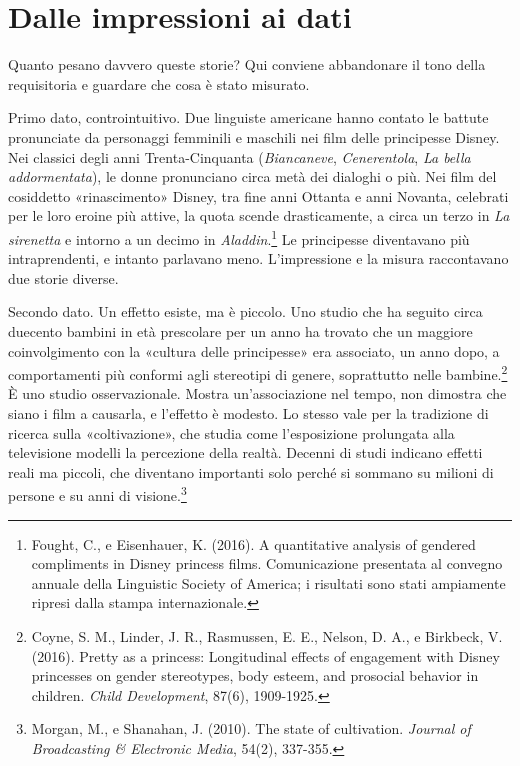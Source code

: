 \section{Dalle impressioni ai dati}
\label{sec:p2c24-dati}

Quanto pesano davvero queste storie? Qui conviene abbandonare il tono della requisitoria e guardare che cosa è stato misurato.

Primo dato, controintuitivo. Due linguiste americane hanno contato le battute pronunciate da personaggi femminili e maschili nei film delle principesse Disney. Nei classici degli anni Trenta-Cinquanta (\textit{Biancaneve}, \textit{Cenerentola}, \textit{La bella addormentata}), le donne pronunciano circa metà dei dialoghi o più. Nei film del cosiddetto «rinascimento» Disney, tra fine anni Ottanta e anni Novanta, celebrati per le loro eroine più attive, la quota scende drasticamente, a circa un terzo in \textit{La sirenetta} e intorno a un decimo in \textit{Aladdin}.\footnote{Fought, C., e Eisenhauer, K. (2016). A quantitative analysis of gendered compliments in Disney princess films. Comunicazione presentata al convegno annuale della Linguistic Society of America; i risultati sono stati ampiamente ripresi dalla stampa internazionale.} Le principesse diventavano più intraprendenti, e intanto parlavano meno. L'impressione e la misura raccontavano due storie diverse.

Secondo dato. Un effetto esiste, ma è piccolo. Uno studio che ha seguito circa duecento bambini in età prescolare per un anno ha trovato che un maggiore coinvolgimento con la «cultura delle principesse» era associato, un anno dopo, a comportamenti più conformi agli stereotipi di genere, soprattutto nelle bambine.\footnote{Coyne, S. M., Linder, J. R., Rasmussen, E. E., Nelson, D. A., e Birkbeck, V. (2016). Pretty as a princess: Longitudinal effects of engagement with Disney princesses on gender stereotypes, body esteem, and prosocial behavior in children. \textit{Child Development}, 87(6), 1909-1925.} È uno studio osservazionale. Mostra un'associazione nel tempo, non dimostra che siano i film a causarla, e l'effetto è modesto. Lo stesso vale per la tradizione di ricerca sulla «coltivazione», che studia come l'esposizione prolungata alla televisione modelli la percezione della realtà. Decenni di studi indicano effetti reali ma piccoli, che diventano importanti solo perché si sommano su milioni di persone e su anni di visione.\footnote{Morgan, M., e Shanahan, J. (2010). The state of cultivation. \textit{Journal of Broadcasting \& Electronic Media}, 54(2), 337-355.}

